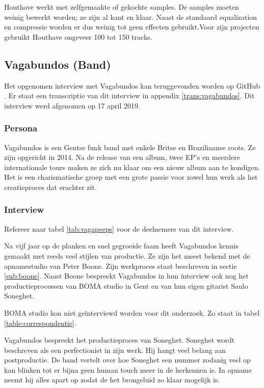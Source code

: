 Houthave werkt met zelfgemaakte of gekochte samples. De samples moeten weinig bewerkt worden; ze zijn al kant en klaar. Naast de standaard equalization en compressie worden er dus weinig tot geen effecten gebruikt.\newline Voor zijn projecten gebruikt Houthave ongeveer 100 tot 150 tracks. \autocite{thomashouthave}

\subsection{Vagabundos (Band)}

Het opgenomen interview met Vagabundos kan teruggevonden worden op GitHub \autocite{vagabundos}. Er staat een transcriptie van dit interview in appendix \ref{trans:vagabundos}. Dit interview werd afgenomen op 17 april 2019.

\subsubsection*{Persona}

Vagabundos is een Gentse funk band met enkele Britse en Braziliaanse roots. Ze zijn opgericht in 2014. Na de release van een album, twee EP's en meerdere internationale tours maken ze zich nu klaar om een nieuw album aan te kondigen. Het is een charismatische groep met een grote passie voor zowel hun werk als het creatieproces dat erachter zit. \autocite{vagabio}

\subsubsection*{Interview}

Refereer naar tabel \ref{tab:vagapeeps} voor de deelnemers van dit interview.

Na vijf jaar op de planken en snel gegroeide faam heeft Vagabundos kennis gemaakt met reeds veel stijlen van productie. Ze zijn het meest bekend met de opnamestudio van Peter Boone. Zijn werkproces staat beschreven in sectie \ref{sub:boone}. Naast Boone bespreekt Vagabundos in hun interview ook nog het productieprocessen van BOMA studio in Gent en van hun eigen gitarist Saulo Soneghet. \autocite{vagabundos}

BOMA studio kon niet geïnterviewd worden voor dit onderzoek. Zo staat in tabel \ref{table:correspondentie}.

Vagabundos bespreekt het productieproces van Soneghet. Soneghet wordt beschreven als een perfectionist in zijn werk. Hij hangt veel belang aan postproductie. De band vertelt over hoe Soneghet een nummer zodanig veel op kan blinken tot er bijna geen human touch meer in de herkennen is. In opname neemt hij alles apart op zodat de het brongeluid zo klaar mogelijk is. \autocite{vagabundos}

